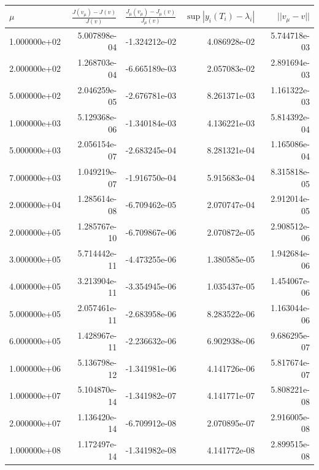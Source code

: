 \documentclass[11pt,a4paper]{report}
\begin{document}
\begin{tabular}{lrrrr}
\toprule
{} $\mu$&  $\frac{J(v_{\mu})-J(v)}{J(v)}$ &  $\frac{J_{\mu}(v_{\mu})-J_{\mu}(v)}{J_{\mu}(v)} $ &         $\sup|y_i(T_{i})-\lambda_i|$ &    $||v_{\mu}-v||$ \\
\midrule
1.000000e+02 &              5.007898e-04 &                   -1.324212e-02 &  4.086928e-02 &  5.744718e-03 \\
2.000000e+02 &              1.268703e-04 &                   -6.665189e-03 &  2.057083e-02 &  2.891694e-03 \\
5.000000e+02 &              2.046259e-05 &                   -2.676781e-03 &  8.261371e-03 &  1.161322e-03 \\
1.000000e+03 &              5.129368e-06 &                   -1.340184e-03 &  4.136221e-03 &  5.814392e-04 \\
5.000000e+03 &              2.056154e-07 &                   -2.683245e-04 &  8.281321e-04 &  1.165086e-04 \\
7.000000e+03 &              1.049219e-07 &                   -1.916750e-04 &  5.915683e-04 &  8.315818e-05 \\
2.000000e+04 &              1.285614e-08 &                   -6.709462e-05 &  2.070747e-04 &  2.912014e-05 \\
2.000000e+05 &              1.285767e-10 &                   -6.709867e-06 &  2.070872e-05 &  2.908512e-06 \\
3.000000e+05 &              5.714442e-11 &                   -4.473255e-06 &  1.380585e-05 &  1.942684e-06 \\
4.000000e+05 &              3.213904e-11 &                   -3.354945e-06 &  1.035437e-05 &  1.454067e-06 \\
5.000000e+05 &              2.057461e-11 &                   -2.683958e-06 &  8.283522e-06 &  1.163044e-06 \\
6.000000e+05 &              1.428967e-11 &                   -2.236632e-06 &  6.902938e-06 &  9.686295e-07 \\
1.000000e+06 &              5.136798e-12 &                   -1.341981e-06 &  4.141726e-06 &  5.817674e-07 \\
1.000000e+07 &              5.104870e-14 &                   -1.341982e-07 &  4.141771e-07 &  5.808221e-08 \\
2.000000e+07 &              1.136420e-14 &                   -6.709912e-08 &  2.070895e-07 &  2.916005e-08 \\
1.000000e+08 &              1.172497e-14 &                   -1.341982e-08 &  4.141772e-08 &  2.899515e-08 \\

\end{tabular}
\end{document}
